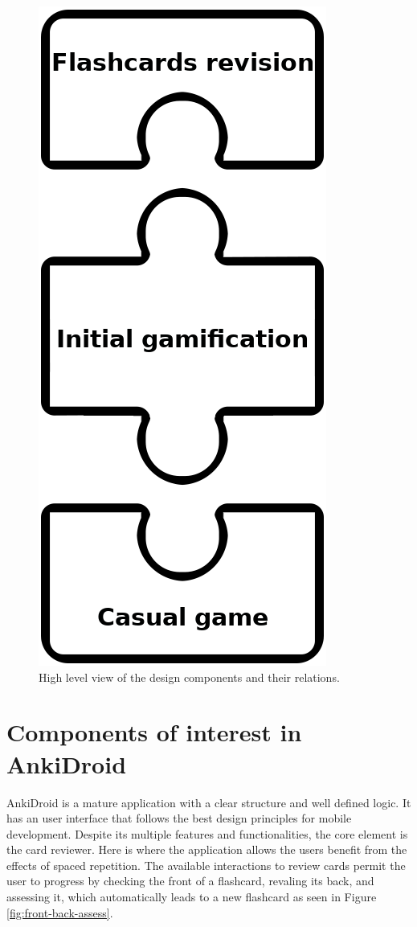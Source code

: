 \begin{figure}[htb]
    \vskip 5mm
        \begin{center}
            \includegraphics[scale=0.4]{./Figures/design.png}
            \caption{High level view of the design components and their relations.}
            \label{fig:game-elem-cards}
        \end{center}
    \vskip -5mm
\end{figure}


\section{Components of interest in AnkiDroid}
\label{desi-components-interest}
AnkiDroid is a mature application with a clear structure and well defined logic. It has an user interface that follows the best design principles for mobile development. Despite its multiple features and functionalities, the core element is the card reviewer. Here is where the application allows the users benefit from the effects of spaced repetition. The available interactions to review cards permit the user to progress by checking the front of a flashcard, revaling its back, and assessing it, which automatically leads to a new flashcard as seen in Figure \ref{fig:front-back-assess}.

